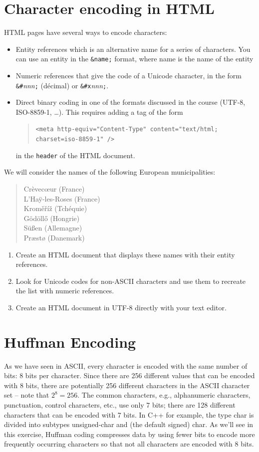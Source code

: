 \documentclass[11pt]{article}
\begin{document}
\section{Character encoding in HTML}
HTML pages have several ways to encode characters:
\begin{itemize}
	\item Entity references which is an alternative name for a series of characters. You can use an entity in the \texttt{\&name;} format, where name is the name of the entity
	\item Numeric references that give the code of a Unicode character, in the form 
	\texttt{\&\#}\emph{nnn}\texttt{;} (décimal) or
	\texttt{\&\#x}\emph{nnn}\texttt{;}.\smallskip
	\item Direct binary coding in one of the formats discussed in the course (UTF-8, ISO-8859-1, \ldots). This requires adding a tag of the form
	\begin{quote}
		\texttt{<meta http-equiv="Content-Type" content="text/html; charset=iso-8859-1" />}
	\end{quote}
	in the \texttt{header} of the HTML document.
\end{itemize}
We will consider the names of the following European municipalities:
\begin{quote}
	Crèvec\oe{}ur (France)\\ L'Ha\"y-les-Roses (France)\\ Krom\v{e}\v{r}\'i\v{z}
	(Tchéquie)\\ G\"od\"oll\H{o} (Hongrie)\\ S\"u\ss{}en (Allemagne)\\
	Pr\ae{}st\o{} (Danemark)
\end{quote}

\begin{enumerate}
	\item Create an HTML document that displays these names with their entity references.
	\item Look for Unicode codes for non-ASCII characters and use them to recreate the list with numeric references.
	\item Create an HTML document in UTF-8 directly with your text editor.
\end{enumerate}




\section{Huffman Encoding}
As we have seen in ASCII, every character is encoded with the same number of bits: 8 bits per character. Since there are 256 different values that can be encoded with 8 bits, there are potentially 256 different characters in the ASCII character set -- note that $2^8 = 256$. The common characters, e.g., alphanumeric characters, punctuation, control characters, etc., use only 7 bits; there are 128 different characters that can be encoded with 7 bits. In C++ for example, the type char is divided into subtypes unsigned-char and (the default signed) char. As we'll see in this exercise, Huffman coding compresses data by using fewer bits to encode more frequently occurring characters so that not all characters are encoded with 8 bits.
\end{document}
